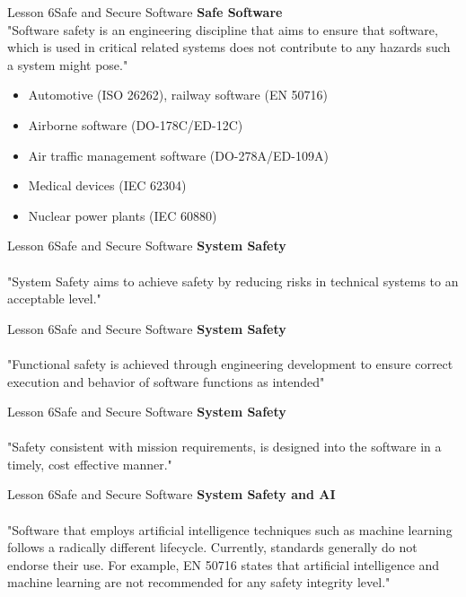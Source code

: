 \documentclass[aspectratio=1610]{beamer}
\begin{document}

\begin{frame}{Lesson 6}{Safe and Secure Software}
\LARGE
\textbf{Safe Software}\\
"Software safety is an engineering discipline that aims to ensure that software, which 
is used in critical related systems does not contribute to any hazards such a system 
might pose."
\begin{itemize}
    \item Automotive (ISO 26262), railway software (EN 50716)
    \item Airborne software (DO-178C/ED-12C)
    \item Air traffic management software (DO-278A/ED-109A)
    \item Medical devices (IEC 62304)
    \item Nuclear power plants (IEC 60880)
\end{itemize}
\end{frame}


\begin{frame}{Lesson 6}{Safe and Secure Software}
\LARGE
\textbf{System Safety}\\~\\
"System Safety aims to achieve safety by reducing risks in technical systems to an 
acceptable level." 
\end{frame}

\begin{frame}{Lesson 6}{Safe and Secure Software}
\LARGE
\textbf{System Safety}\\~\\
"Functional safety is achieved through engineering development to ensure correct 
execution and behavior of software functions as intended"
\end{frame}


\begin{frame}{Lesson 6}{Safe and Secure Software}
\LARGE
\textbf{System Safety}\\~\\
"Safety consistent with mission requirements, is designed into the software in a 
timely, cost effective manner."
\end{frame}


\begin{frame}{Lesson 6}{Safe and Secure Software}
\LARGE
\textbf{System Safety and AI}\\~\\
"Software that employs artificial intelligence techniques such as machine learning 
follows a radically different lifecycle. Currently, standards generally do not endorse 
their use. For example, EN 50716 states that artificial intelligence and machine 
learning are not recommended for any safety integrity level."
\end{frame}
\end{document}
